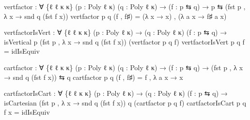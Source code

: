 \documentclass[
  11pt,
  oneside,
  article]{memoir}
\newenvironment{Shaded}{}{}
\newcommand{\NormalTok}[1]{#1}
\newcommand{\OtherTok}[1]{\textcolor[rgb]{0.00,0.44,0.13}{#1}}
\theoremstyle{definition}
\theoremstyle{plain}
\newcommand{\0}{\textsf{0}}
\newcommand{\1}{\tn{\textsf{1}}}
\begin{document}
\begin{Shaded}
\begin{Highlighting}[]
\NormalTok{vertfactor }\OtherTok{:} \OtherTok{∀} \OtherTok{\{}\NormalTok{ℓ ℓ\textquotesingle{} κ κ\textquotesingle{}}\OtherTok{\}} \OtherTok{(}\NormalTok{p }\OtherTok{:}\NormalTok{ Poly ℓ κ}\OtherTok{)} \OtherTok{(}\NormalTok{q }\OtherTok{:}\NormalTok{ Poly ℓ\textquotesingle{} κ\textquotesingle{}}\OtherTok{)}
             \OtherTok{→} \OtherTok{(}\NormalTok{f }\OtherTok{:}\NormalTok{ p ⇆ q}\OtherTok{)} \OtherTok{→}\NormalTok{ p ⇆ }\OtherTok{(}\NormalTok{fst p , }\OtherTok{λ}\NormalTok{ x }\OtherTok{→}\NormalTok{ snd q }\OtherTok{(}\NormalTok{fst f x}\OtherTok{))}
\NormalTok{vertfactor p q }\OtherTok{(}\NormalTok{f , f♯}\OtherTok{)} \OtherTok{=} \OtherTok{(λ}\NormalTok{ x }\OtherTok{→}\NormalTok{ x}\OtherTok{)}\NormalTok{ , }\OtherTok{(λ}\NormalTok{ a x }\OtherTok{→}\NormalTok{ f♯ a x}\OtherTok{)}

\NormalTok{vertfactorIsVert }\OtherTok{:} \OtherTok{∀} \OtherTok{\{}\NormalTok{ℓ ℓ\textquotesingle{} κ κ\textquotesingle{}}\OtherTok{\}} \OtherTok{(}\NormalTok{p }\OtherTok{:}\NormalTok{ Poly ℓ κ}\OtherTok{)} 
                   \OtherTok{→} \OtherTok{(}\NormalTok{q }\OtherTok{:}\NormalTok{ Poly ℓ\textquotesingle{} κ\textquotesingle{}}\OtherTok{)} \OtherTok{(}\NormalTok{f }\OtherTok{:}\NormalTok{ p ⇆ q}\OtherTok{)} 
                   \OtherTok{→}\NormalTok{ isVertical p }\OtherTok{(}\NormalTok{fst p , }\OtherTok{λ}\NormalTok{ x }\OtherTok{→}\NormalTok{ snd q }\OtherTok{(}\NormalTok{fst f x}\OtherTok{))}
                                \OtherTok{(}\NormalTok{vertfactor p q f}\OtherTok{)}
\NormalTok{vertfactorIsVert p q f }\OtherTok{=}\NormalTok{ idIsEquiv}

\NormalTok{cartfactor }\OtherTok{:} \OtherTok{∀} \OtherTok{\{}\NormalTok{ℓ ℓ\textquotesingle{} κ κ\textquotesingle{}}\OtherTok{\}} \OtherTok{(}\NormalTok{p }\OtherTok{:}\NormalTok{ Poly ℓ κ}\OtherTok{)} \OtherTok{(}\NormalTok{q }\OtherTok{:}\NormalTok{ Poly ℓ\textquotesingle{} κ\textquotesingle{}}\OtherTok{)}
             \OtherTok{→} \OtherTok{(}\NormalTok{f }\OtherTok{:}\NormalTok{ p ⇆ q}\OtherTok{)} \OtherTok{→} \OtherTok{(}\NormalTok{fst p , }\OtherTok{λ}\NormalTok{ x }\OtherTok{→}\NormalTok{ snd q }\OtherTok{(}\NormalTok{fst f x}\OtherTok{))}\NormalTok{ ⇆ q}
\NormalTok{cartfactor p q }\OtherTok{(}\NormalTok{f , f♯}\OtherTok{)} \OtherTok{=}\NormalTok{ f , }\OtherTok{λ}\NormalTok{ a x }\OtherTok{→}\NormalTok{ x}

\NormalTok{cartfactorIsCart }\OtherTok{:} \OtherTok{∀} \OtherTok{\{}\NormalTok{ℓ ℓ\textquotesingle{} κ κ\textquotesingle{}}\OtherTok{\}} \OtherTok{(}\NormalTok{p }\OtherTok{:}\NormalTok{ Poly ℓ κ}\OtherTok{)} 
                   \OtherTok{→} \OtherTok{(}\NormalTok{q }\OtherTok{:}\NormalTok{ Poly ℓ\textquotesingle{} κ\textquotesingle{}}\OtherTok{)} \OtherTok{(}\NormalTok{f }\OtherTok{:}\NormalTok{ p ⇆ q}\OtherTok{)} 
                   \OtherTok{→}\NormalTok{ isCartesian }\OtherTok{(}\NormalTok{fst p , }\OtherTok{λ}\NormalTok{ x }\OtherTok{→}\NormalTok{ snd q }\OtherTok{(}\NormalTok{fst f x}\OtherTok{))}\NormalTok{ q}
                                 \OtherTok{(}\NormalTok{cartfactor p q f}\OtherTok{)}
\NormalTok{cartfactorIsCart p q f x }\OtherTok{=}\NormalTok{ idIsEquiv}


\end{Highlighting}
\end{Shaded}
\end{document}
